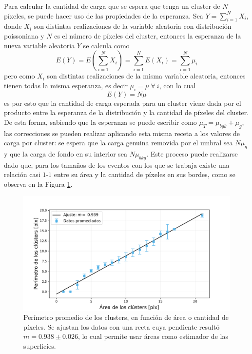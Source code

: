 Para calcular la cantidad de carga que se espera que tenga un cluster de $N$ píxeles, se puede hacer uso de las propiedades de la esperanza. Sea $Y = \sum\limits_{i = 1}^{N} X_{i}$, donde $X_{i}$ son distintas realizaciones de la variable aleatoria con distribución poissoniana y $N$ es el número de píxeles del cluster, entonces la esperanza de la nueva variable aleatoria $Y$ se calcula como
\begin{equation*}
     E(Y) = 
     E
     \left(
         \sum\limits_{i=1}^{N} X_{i}
     \right)
     = \sum\limits_{i=1}^{N}E(X_{i})
     = \sum\limits_{i=1}^{N}\mu_{i}
\end{equation*}
pero como $X_{i}$ son distintas realizaciones de la misma variable aleatoria, entonces tienen todas la misma esperanza, es decir $\mu_{i} = \mu\ \forall\ i$, con lo cual
\begin{equation*}
    E(Y) = N\mu
\end{equation*}
es por esto que la cantidad de carga esperada para un cluster viene dada por el producto entre la esperanza de la distribución y la cantidad de píxeles del cluster. De esta forma, sabiendo que la esperanza se puede escribir como $\mu_{T} = \mu_{bgk} + \mu_{g}$, las correcciones se pueden realizar aplicando esta misma receta a los valores de carga por cluster: se espera que la carga genuina removida por el umbral sea $N\mu_{g}$ y que la carga de fondo en su interior sea $N\mu_{bkg}$. Este proceso puede realizarse dado que, para los tamaños de los eventos con los que se trabaja existe una relación casi $1$-$1$ entre su área y la cantidad de píxeles en sus bordes, como se observa en la Figura \ref{fig:relacion_area_perimetro}.
\begin{figure}[h]
    \centering
    \includegraphics[scale=0.5]{Figs/clusters_perimetro_vs_area.pdf}
    \caption{Perímetro promedio de los clusters, en función de área o cantidad de píxeles. Se ajustan los datos con una recta cuya pendiente resultó $m = 0.938 \pm 0.026$, lo cual permite usar áreas como estimador de las superficies.}
    \label{fig:relacion_area_perimetro}
\end{figure}
